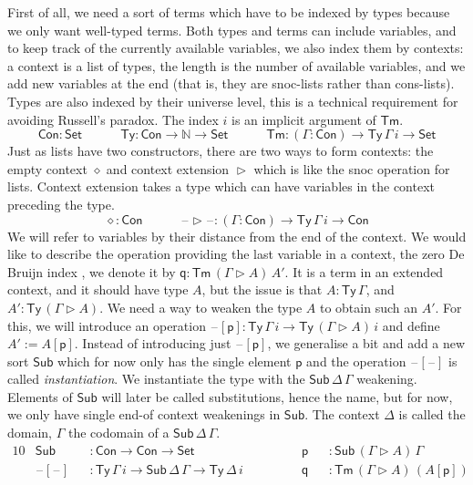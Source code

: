 \documentclass[a4paper,UKenglish]{article}
\newcommand{\ra}{\rightarrow}
\newcommand{\Set}{\mathsf{Set}}
\newcommand{\Ty}{\mathsf{Ty}}
\newcommand{\Tm}{\mathsf{Tm}}
\newcommand{\Con}{\mathsf{Con}}
\newcommand{\Sub}{\mathsf{Sub}}
\newcommand{\p}{\mathsf{p}}
\newcommand{\q}{\mathsf{q}}
\newcommand{\ext}{\mathop{\triangleright}}
\newcommand{\N}{\mathbb{N}}
\newcommand{\blank}{\mathord{\hspace{1pt}\text{--}\hspace{1pt}}} %
\begin{document}
First of all, we need a sort of terms which have to be indexed by
types because we only want well-typed terms. Both types and terms can
include variables, and to keep track of the currently available
variables, we also index them by contexts: a context is a list of
types, the length is the number of available variables, and we add new
variables at the end (that is, they are snoc-lists rather than
cons-lists). Types are also indexed by their universe level, this is a
technical requirement for avoiding Russell's paradox. The index $i$ is
an implicit argument of $\Tm$.
\[
\Con : \Set \hspace{3em} 
\Ty : \Con\ra\N\ra\Set \hspace{3em} 
\Tm : (\Gamma:\Con)\ra\Ty\,\Gamma\,i\ra\Set
\]
Just as lists have two constructors, there are two ways to form
contexts: the empty context $\diamond$ and context extension $\ext$
which is like the snoc operation for lists. Context extension takes a
type which can have variables in the context preceding the type.
\[
\diamond : \Con \hspace{3em}
\blank\ext\blank : (\Gamma:\Con)\ra\Ty\,\Gamma\,i\ra\Con
\]
We will refer to variables by their distance from the end of the
context. We would like to describe the operation providing the last
variable in a context, the zero De Bruijn index \cite{debruijn}, we
denote it by $\q : \Tm\,(\Gamma\ext A)\,A'$. It is a term in an
extended context, and it should have type $A$, but the issue is that
$A : \Ty\,\Gamma$, and $A' : \Ty\,(\Gamma\ext A)$. We need a way to
weaken the type $A$ to obtain such an $A'$. For this, we will
introduce an operation $\blank[\p] : \Ty\,\Gamma\,i\ra\Ty\,(\Gamma\ext
A)\,i$ and define $A' := A[\p]$. Instead of introducing just
$\blank[\p]$, we generalise a bit and add a new sort $\Sub$ which for
now only has the single element $\p$ and the operation
$\blank[\blank]$ is called \emph{instantiation}. We instantiate the
type with the $\Sub\,\Delta\,\Gamma$ weakening.  Elements of $\Sub$
will later be called substitutions, hence the name, but for now, we
only have single end-of context weakenings in $\Sub$. The context
$\Delta$ is called the domain, $\Gamma$ the codomain of a
$\Sub\,\Delta\,\Gamma$.
\begin{alignat*}{10}
  & \Sub && : \Con\ra\Con\ra\Set && \p && : \Sub\,(\Gamma\ext A)\,\Gamma \\
  & \blank[\blank] && : \Ty\,\Gamma\,i\ra\Sub\,\Delta\,\Gamma\ra\Ty\,\Delta\,i \hspace{3em} && \q && : \Tm\,(\Gamma\ext A)\,(A[\p])
\end{alignat*}
\end{document}
